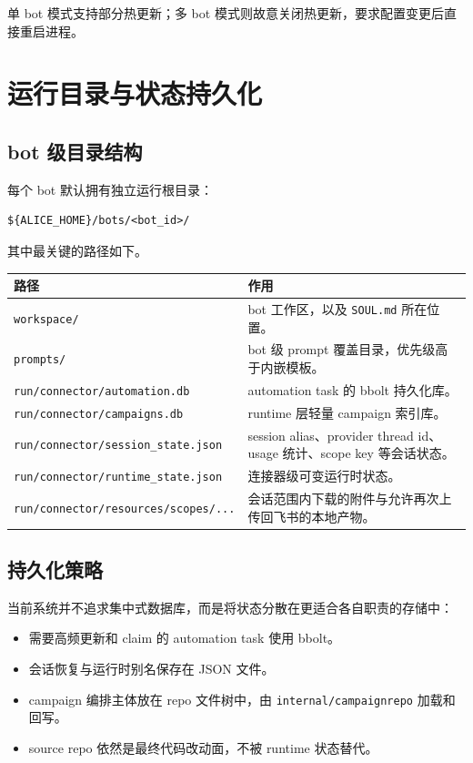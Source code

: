 \documentclass[12pt,a4paper]{ctexart}
\begin{document}
单 bot 模式支持部分热更新；多 bot 模式则故意关闭热更新，要求配置变更后直接重启进程。

\section{运行目录与状态持久化}

\subsection{bot 级目录结构}

每个 bot 默认拥有独立运行根目录：

\begin{verbatim}
${ALICE_HOME}/bots/<bot_id>/
\end{verbatim}

其中最关键的路径如下。

\begin{longtable}{p{} p{}}
\toprule
路径 & 作用 \\
\midrule
\endhead
\texttt{workspace/} & bot 工作区，以及 \texttt{SOUL.md} 所在位置。 \\
\texttt{prompts/} & bot 级 prompt 覆盖目录，优先级高于内嵌模板。 \\
\texttt{run/connector/automation.db} & automation task 的 bbolt 持久化库。 \\
\texttt{run/connector/campaigns.db} & runtime 层轻量 campaign 索引库。 \\
\texttt{run/connector/session\_state.json} & session alias、provider thread id、usage 统计、scope key 等会话状态。 \\
\texttt{run/connector/runtime\_state.json} & 连接器级可变运行时状态。 \\
\texttt{run/connector/resources/scopes/...} & 会话范围内下载的附件与允许再次上传回飞书的本地产物。 \\
\bottomrule
\end{longtable}

\subsection{持久化策略}

当前系统并不追求集中式数据库，而是将状态分散在更适合各自职责的存储中：

\begin{itemize}
  \item 需要高频更新和 claim 的 automation task 使用 bbolt。
  \item 会话恢复与运行时别名保存在 JSON 文件。
  \item campaign 编排主体放在 repo 文件树中，由 \texttt{internal/campaignrepo} 加载和回写。
  \item source repo 依然是最终代码改动面，不被 runtime 状态替代。
\end{itemize}
\end{document}
